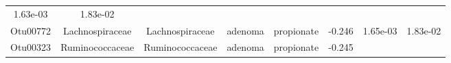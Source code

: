 \documentclass[11pt,]{article}
\begin{document}
\begin{longtable}[]{@{}cccccccc@{}}
\begin{minipage}[t]{0.08\columnwidth}
1.63e-03\strut
\end{minipage} & \begin{minipage}[t]{0.08\columnwidth}\centering\strut
1.83e-02\strut
\end{minipage}\tabularnewline
\begin{minipage}[t]{0.08\columnwidth}\centering\strut
Otu00772\strut
\end{minipage} & \begin{minipage}[t]{0.15\columnwidth}\centering\strut
Lachnospiraceae\strut
\end{minipage} & \begin{minipage}[t]{0.15\columnwidth}\centering\strut
Lachnospiraceae\strut
\end{minipage} & \begin{minipage}[t]{0.08\columnwidth}\centering\strut
adenoma\strut
\end{minipage} & \begin{minipage}[t]{0.09\columnwidth}\centering\strut
propionate\strut
\end{minipage} & \begin{minipage}[t]{0.07\columnwidth}\centering\strut
-0.246\strut
\end{minipage} & \begin{minipage}[t]{0.08\columnwidth}\centering\strut
1.65e-03\strut
\end{minipage} & \begin{minipage}[t]{0.08\columnwidth}\centering\strut
1.83e-02\strut
\end{minipage}\tabularnewline
\begin{minipage}[t]{0.08\columnwidth}\centering\strut
Otu00323\strut
\end{minipage} & \begin{minipage}[t]{0.15\columnwidth}\centering\strut
Ruminococcaceae\strut
\end{minipage} & \begin{minipage}[t]{0.15\columnwidth}\centering\strut
Ruminococcaceae\strut
\end{minipage} & \begin{minipage}[t]{0.08\columnwidth}\centering\strut
adenoma\strut
\end{minipage} & \begin{minipage}[t]{0.09\columnwidth}\centering\strut
propionate\strut
\end{minipage} & \begin{minipage}[t]{0.07\columnwidth}\centering\strut
-0.245\strut
\end{minipage} & \begin{minipage}[t]{0.08\columnwidth}\centering\strut

\end{minipage}
\end{longtable}
\end{document}
